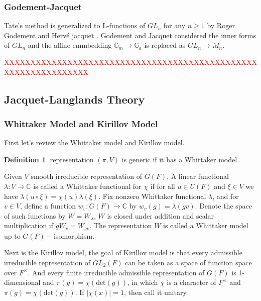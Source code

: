 \documentclass[12pt,a4paper,english]{article}
\theoremstyle{plain}
\theoremstyle{definition}
\newtheorem{defi}{Definition}
\begin{document}
\subsubsection{Godement-Jacquet}
Tate's method is generalized to L-functions of $GL_{n}$ for any $n\geq1$ by Roger Godement and Herv\'{e} jacquet \cite{goldfeld2006automorphic}. Godement and Jacquet considered the inner forms of $GL_{n}$ and the affine emmbedding $\mathbb{G}_{m}\rightarrow\mathbb{G}_{a}$ is replaced as $GL_{n}\rightarrow M_{n}$.

\textcolor{red}{XXXXXXXXXXXXXXXXXXXXXXXXXXXXXXXXXXXXXXXXXXXXXXXXXXXXXXXXXXXXXXXX}
\subsection{Jacquet-Langlands Theory}
\subsubsection{Whittaker Model and Kirillov Model}
First let's review the Whittaker model and Kirillov model. 
\begin{defi}
representation $(\pi, V)$ is  generic if it has a Whittaker model. 
\end{defi}
Given $V$ smooth irreducible representation of $G(F)$, A linear functional $\lambda: V\rightarrow \mathbb{C}$ is called a Whittaker functional for $\chi$ if for all $u\in U(F)$ and $\xi\in V$ we have $\lambda(u\circ\xi)=\chi(u)\lambda(\xi)$. Fix nonzero Whittaker functional $\lambda$, and for $v\in V$, define a function $w_{v}: G(F)\rightarrow \mathbb{C}$ by $w_{v}(g)=\lambda(gv)$. Denote the space of such functions by $W=W_{\lambda}$, $W$ is closed under addition and scalar multiplication if $gW_{v}=W_{gv}$. The representation $W$ is called a Whittaker model up to $G(F)-$isomorphism.

Next is the Kirillov model, the goal of Kirillov model is that every admissible irreducible representation of $GL_{2}(F)$ can be taken as a space of function space over $F^{\times}$. And every finite irreducible admissible representation of $G(F)$ is 1-dimensional and $\pi(g)=\chi(\text{det}(g))$, in which $\chi$ is a character of $F^{\times}$ and $\pi(g)=\chi(\text{det}(g))$. If $|\chi(x)|=1$, then call it unitary. 
\end{document}
